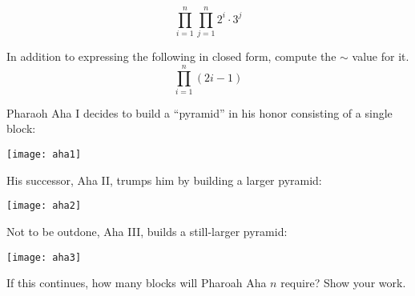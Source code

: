 \documentclass[12pt,twoside]{article}
\begin{document}
\begin{problem}
\[
\prod_{i=1}^n \prod_{j=1}^n 2^i \cdot 3^j
\]


In addition to expressing the following in closed form, compute the $\sim$ value for it.
\[
\prod_{i=1}^n (2i-1)
\]

\eparts
\end{problem}


\begin{problem}
Pharaoh Aha I decides to build a ``pyramid'' in his honor consisting
of a single block:

\begin{center}
\texttt{[image: aha1]}
\end{center}

\noindent His successor, Aha II, trumps him by building a larger
pyramid:

\begin{center}
\texttt{[image: aha2]}
\end{center}

\noindent Not to be outdone, Aha III, builds a still-larger pyramid:

\begin{center}
\texttt{[image: aha3]}
\end{center}

\noindent If this continues, how many blocks will Pharoah Aha $n$
require?  Show your work.
\end{problem}
\end{document}
